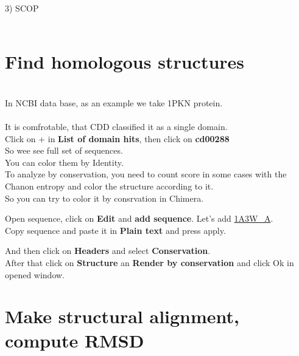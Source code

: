\documentclass{article}
\begin{document}
3) SCOP \href{http://scop.mrc-lmb.cam.ac.uk/}\\
\\




\section{Find homologous structures} \\

In NCBI data base, as an example we take 1PKN protein. \\

\href{https://www.ncbi.nlm.nih.gov/Structure/cdd/wrpsb.cgi?INPUT_TYPE=live&SEQUENCE=1PKN_A} \\

It is comfrotable, that CDD classified it as a single domain. \\

Click on + in \textbf{List of domain hits}, then click on \textbf{cd00288} \\

So wee see full set of sequences. \\

You can color them by Identity. \\

To analyze by conservation, you need to count score in some cases with the Chanon entropy and color the structure according to it. \\

So you can try to color it by consrvation in Chimera.

Open sequence, click on \textbf{Edit} and \textbf{add sequence}. Let's add  \href{https://www.ncbi.nlm.nih.gov/protein/1A3W_A?report=fasta}{1A3W\_A}. \\

Copy sequence and paste it in \textbf{Plain text} and press apply.

And then click on \textbf{Headers} and select \textbf{Conservation}. \\

After that click on \textbf{Structure} an \textbf{Render by conservation} and click Ok in opened window. \\




\section{Make structural alignment, compute RMSD}\\
\end{document}

